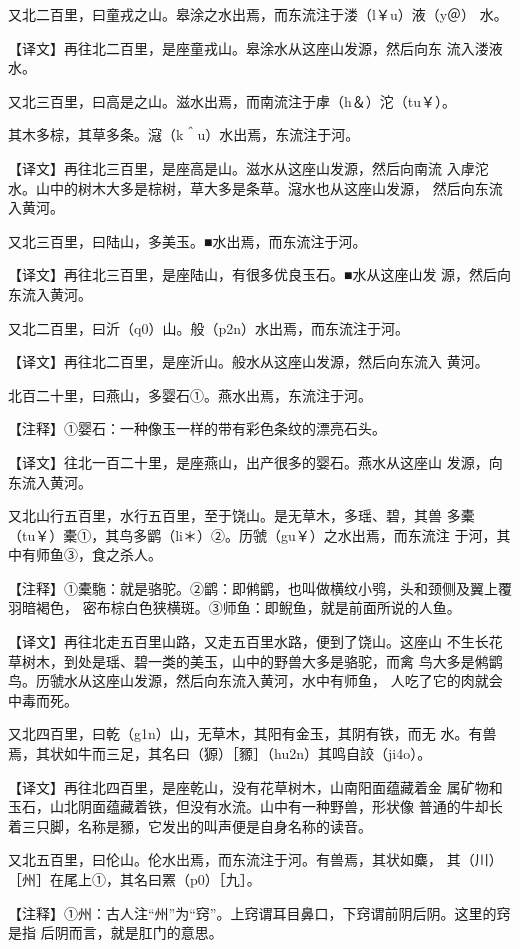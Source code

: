 \documentclass[a4paper,12pt,UTF8,twoside]{ctexbook}
\begin{document}
又北二百里，曰童戎之山。皋涂之水出焉，而东流注于溇（l￥u）液（y＠） 水。

【译文】再往北二百里，是座童戎山。皋涂水从这座山发源，然后向东 流入溇液水。

又北三百里，曰高是之山。滋水出焉，而南流注于虖（h＆）沱（tu￥）。

其木多棕，其草多条。滱（k＾u）水出焉，东流注于河。

【译文】再往北三百里，是座高是山。滋水从这座山发源，然后向南流 入虖沱水。山中的树木大多是棕树，草大多是条草。滱水也从这座山发源， 然后向东流入黄河。

又北三百里，曰陆山，多美玉。■水出焉，而东流注于河。

【译文】再往北三百里，是座陆山，有很多优良玉石。■水从这座山发 源，然后向东流入黄河。

又北二百里，曰沂（q0）山。般（p2n）水出焉，而东流注于河。

【译文】再往北二百里，是座沂山。般水从这座山发源，然后向东流入 黄河。

北百二十里，曰燕山，多婴石①。燕水出焉，东流注于河。

【注释】①婴石：一种像玉一样的带有彩色条纹的漂亮石头。

【译文】往北一百二十里，是座燕山，出产很多的婴石。燕水从这座山 发源，向东流入黄河。

又北山行五百里，水行五百里，至于饶山。是无草木，多瑶、碧，其兽 多橐（tu￥）橐①，其鸟多鹠（li＊）②。历虢（gu￥）之水出焉，而东流注 于河，其中有师鱼③，食之杀人。

【注释】①橐駞：就是骆驼。②鹠：即鸺鹠，也叫做横纹小鸮，头和颈侧及翼上覆羽暗褐色， 密布棕白色狭横斑。③师鱼：即鲵鱼，就是前面所说的人鱼。

【译文】再往北走五百里山路，又走五百里水路，便到了饶山。这座山 不生长花草树木，到处是瑶、碧一类的美玉，山中的野兽大多是骆驼，而禽 鸟大多是鸺鹠鸟。历虢水从这座山发源，然后向东流入黄河，水中有师鱼， 人吃了它的肉就会中毒而死。

又北四百里，曰乾（g1n）山，无草木，其阳有金玉，其阴有铁，而无 水。有兽焉，其状如牛而三足，其名曰（獂）［豲］（hu2n）其鸣自詨（ji4o）。

【译文】再往北四百里，是座乾山，没有花草树木，山南阳面蕴藏着金 属矿物和玉石，山北阴面蕴藏着铁，但没有水流。山中有一种野兽，形状像 普通的牛却长着三只脚，名称是豲，它发出的叫声便是自身名称的读音。

又北五百里，曰伦山。伦水出焉，而东流注于河。有兽焉，其状如麋， 其（川）［州］在尾上①，其名曰罴（p0）［九］。

【注释】①州：古人注“州”为“窍”。上窍谓耳目鼻口，下窍谓前阴后阴。这里的窍是指 后阴而言，就是肛门的意思。
\end{document}
